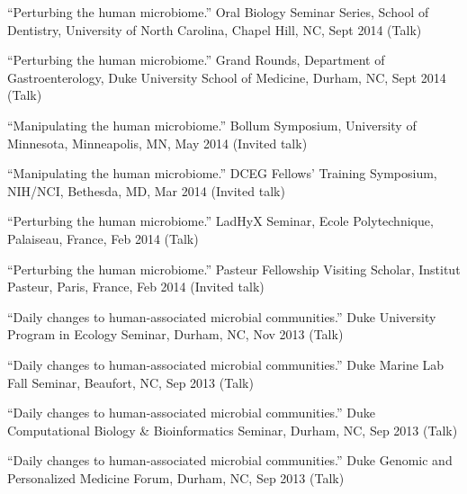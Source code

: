 \documentclass[overlapped,line,11pt]{res}
\begin{document}
\begin{resume}
\begin{revnumerate}[43]
\item {``Perturbing the human microbiome.''
  Oral Biology Seminar Series, School of Dentistry, University of
  North Carolina, Chapel Hill, NC, Sept 2014
  (Talk)}
\vspace*{0mm}

\item {``Perturbing the human microbiome.''
  Grand Rounds, Department of Gastroenterology, Duke University School of
  Medicine, Durham, NC, Sept 2014
  (Talk)}
\vspace*{0mm}

\item {``Manipulating the human microbiome.''
  Bollum Symposium, University of Minnesota, Minneapolis, MN, May 2014
  (Invited talk)}
\vspace*{0mm}

\item {``Manipulating the human microbiome.''
  DCEG Fellows’ Training Symposium, NIH/NCI, Bethesda, MD, Mar 2014
  (Invited talk)}
\vspace*{0mm}

\item {``Perturbing the human microbiome.''  LadHyX Seminar, Ecole
  Polytechnique, Palaiseau, France, Feb 2014 (Talk)}
\vspace*{0mm}

\item {``Perturbing the human microbiome.''
  Pasteur Fellowship Visiting Scholar, Institut Pasteur,
  Paris, France, Feb 2014 (Invited talk)}
\vspace*{0mm}

\item {``Daily changes to human-associated microbial communities.''
  Duke University Program in Ecology Seminar,
  Durham, NC, Nov 2013 (Talk)}
\vspace*{0mm}

\item {``Daily changes to human-associated microbial communities.''
  Duke Marine Lab Fall Seminar,
  Beaufort, NC, Sep 2013 (Talk)}
\vspace*{0mm}

\item {``Daily changes to human-associated microbial communities.''
  Duke Computational Biology \& Bioinformatics Seminar,
  Durham, NC, Sep 2013 (Talk)}
\vspace*{0mm}

\item {``Daily changes to human-associated microbial communities.''
  Duke Genomic and Personalized Medicine Forum,
  Durham, NC, Sep 2013 (Talk)}
\vspace*{0mm}


\end{revnumerate}
\end{resume}
\end{document}
